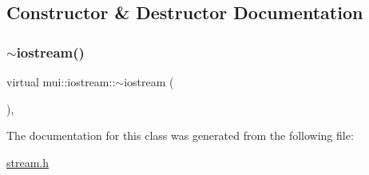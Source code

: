 \subsection{Constructor \& Destructor Documentation}
\mbox{\label{classmui_1_1iostream_af412ceca6334a3ad45c0ca6799ecae10}} 
\subsubsection{\texorpdfstring{$\sim$iostream()}{~iostream()}}
{\footnotesize\ttfamily virtual mui\+::iostream\+::$\sim$iostream (\begin{DoxyParamCaption}{ }\end{DoxyParamCaption})\hspace{0.3cm}{\ttfamily [inline]}, {\ttfamily [virtual]}}



The documentation for this class was generated from the following file\+:\begin{DoxyCompactItemize}
\item 
\hyperlink{stream_8h}{stream.\+h}\end{DoxyCompactItemize}
